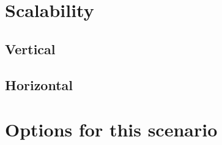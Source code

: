 
\section{Scalability}


\subsection{Vertical}


\subsection{Horizontal}


\section{Options for this scenario}

